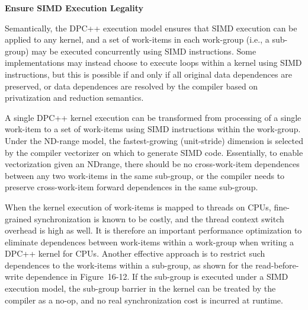 \hspace*{\fill} \par %
\textbf{Ensure SIMD Execution Legality}

Semantically, the DPC++ execution model ensures that SIMD execution can be applied to any kernel, and a set of work-items in each work-group (i.e., a sub-group) may be executed concurrently using SIMD instructions. Some implementations may instead choose to execute loops within a kernel using SIMD instructions, but this is possible if and only if all original data dependences are preserved, or data dependences are resolved by the compiler based on privatization and reduction semantics.\par

A single DPC++ kernel execution can be transformed from processing of a single work-item to a set of work-items using SIMD instructions within the work-group. Under the ND-range model, the fastest-growing (unit-stride) dimension is selected by the compiler vectorizer on which to generate SIMD code. Essentially, to enable vectorization given an NDrange, there should be no cross-work-item dependences between any two work-items in the same sub-group, or the compiler needs to preserve cross-work-item forward dependences in the same sub-group.\par

When the kernel execution of work-items is mapped to threads on CPUs, fine-grained synchronization is known to be costly, and the thread context switch overhead is high as well. It is therefore an important performance optimization to eliminate dependences between work-items within a work-group when writing a DPC++ kernel for CPUs. Another effective approach is to restrict such dependences to the work-items within a sub-group, as shown for the read-before-write dependence in Figure 16-12. If the sub-group is executed under a SIMD execution model, the sub-group barrier in the kernel can be treated by the compiler as a no-op, and no real synchronization cost is incurred at runtime.\par

